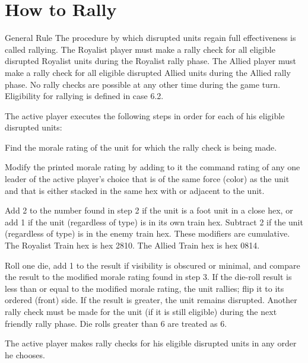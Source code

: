 \section{How to Rally}

\begin{rulebox}{General Rule}
The procedure by which disrupted units regain full effectiveness is called rallying. The Royalist player must make a rally check for all eligible disrupted Royalist units during the Royalist rally phase. The Allied player must make a rally check for all eligible disrupted Allied units during the Allied rally phase. No rally checks are possible at any other time during the game turn. Eligibility for rallying is defined in case 6.2.
\end{rulebox}


The active player executes the following steps in order for each of his eligible disrupted units:

\begin{steps}
  \item Find the morale rating of the unit for which the rally check is being made.
  \item Modify the printed morale rating by adding to it the command rating of any one leader of the active player's choice that is of the same force (color) as the unit and that is either stacked in the same hex with or adjacent to the unit.
  \item Add 2 to the number found in step 2 if the unit is a foot unit in a close hex, or add 1 if the unit (regardless of type) is in its own train hex. Subtract 2 if the unit (regardless of type) is in the enemy train hex. These modifiers are cumulative. The Royalist Train hex is hex 2810. The Allied Train hex is hex 0814.
  \item Roll one die, add 1 to the result if visibility is obscured or minimal, and compare the result to the modified morale rating found in step 3. If the die-roll result is less than or equal to the modified morale rating, the unit rallies; flip it to its ordered (front) side. If the result is greater, the unit remains disrupted. Another rally check must be made for the unit (if it is still eligible) during the next friendly rally phase. Die rolls greater than 6 are treated as 6.
\end{steps}

 The active player makes rally checks for his eligible disrupted units in any order he chooses.

